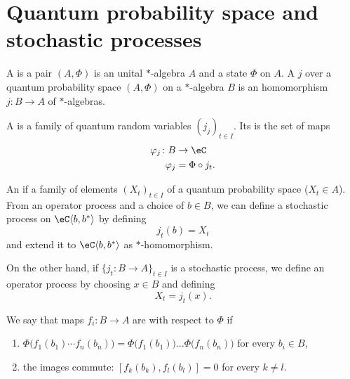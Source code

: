 \section{Quantum probability space and stochastic processes}

A  is a pair $(A,\Phi)$ is an unital $*$-algebra $A$ and a state $\Phi$ on $A$. A  $j$ over a quantum probability space $(A,\Phi)$ on a $*$-algebra $B$ is an homomorphism $j\colon B\to A$ of $*$-algebras.

A  is a family of quantum random variables $(j_j)_{t\in I}$. Its  is the set of maps
\begin{equation}
    \begin{aligned}
        \varphi_j\colon B&\to \eC \\
        \varphi_j&=\Phi\circ j_t. 
    \end{aligned}
\end{equation}

An  if a family of elements $(X_t)_{t\in I}$ of a quantum probability space ($X_t\in A$). From an operator process and a choice of $b\in B$, we can define a stochastic process on $\eC\langle b,b^*\rangle$ by defining
\begin{equation}
    j_t(b)=X_t
\end{equation}
and extend it to $\eC\langle b,b^*\rangle$ as $*$-homomorphism.

On the other hand, if $\{ j_t\colon B\to A \}_{t\in I}$ is a stochastic process, we define an operator process by choosing $x\in B$ and defining
\begin{equation}
    X_t=j_t(x).
\end{equation}

\begin{definition}
    We say that maps $f_i\colon B\to A$ are  with respect to $\Phi$ if 
    \begin{enumerate}
        \item
            $\Phi\big( f_1(b_1)\cdots f_n(b_n) \big)=\Phi\big( f_1(b_1) \big)\ldots\Phi\big( f_n(b_n) \big)$ for every $b_i\in B$,
        \item
            the images commute: $[f_k(b_k),f_l(b_l)]=0$ for every $k\neq l$.
    \end{enumerate}
\end{definition}

